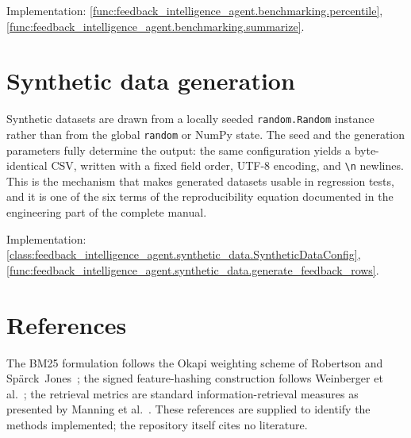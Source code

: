 \medskip\noindent
Implementation: \cref{func:feedback_intelligence_agent.benchmarking.percentile},
\cref{func:feedback_intelligence_agent.benchmarking.summarize}.

\section{Synthetic data generation}
\label{sec:math-synthetic}

Synthetic datasets are drawn from a locally seeded
\texttt{random.Random} instance rather than from the global \texttt{random} or
NumPy state. The seed and the generation parameters fully determine the output:
the same configuration yields a byte-identical CSV, written with a fixed field
order, UTF-8 encoding, and \texttt{\textbackslash n} newlines. This is the
mechanism that makes generated datasets usable in regression tests, and it is
one of the six terms of the reproducibility equation documented in the
engineering part of the complete manual.

\medskip\noindent
Implementation: \cref{class:feedback_intelligence_agent.synthetic_data.SyntheticDataConfig},
\cref{func:feedback_intelligence_agent.synthetic_data.generate_feedback_rows}.

\section{References}

The BM25 formulation follows the Okapi weighting scheme of
Robertson and Sp\"arck~Jones~\cite{robertson1976relevance,robertson2009prf};
the signed feature-hashing construction follows
Weinberger et al.~\cite{weinberger2009hashing}; the retrieval metrics are
standard information-retrieval measures as presented by
Manning et al.~\cite{manning2008ir}. These references are supplied to identify
the methods implemented; the repository itself cites no literature.
